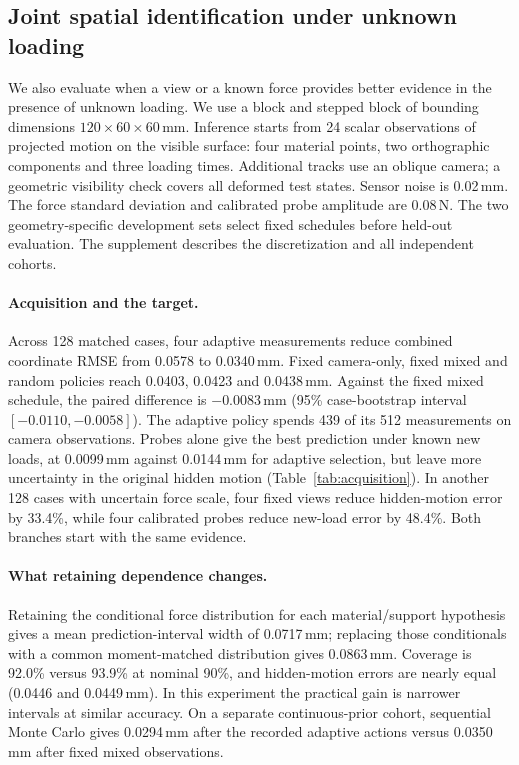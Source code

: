 \documentclass[10pt,twocolumn,letterpaper]{article}
\begin{document}
\subsection{Joint spatial identification under unknown loading}
We also evaluate when a view or a known force provides better evidence in the presence of unknown loading. We use a block and stepped block of bounding dimensions $120\times60\times60$\,mm. Inference starts from 24 scalar observations of projected motion on the visible surface: four material points, two orthographic components and three loading times. Additional tracks use an oblique camera; a geometric visibility check covers all deformed test states. Sensor noise is 0.02\,mm. The force standard deviation and calibrated probe amplitude are 0.08\,N. The two geometry-specific development sets select fixed schedules before held-out evaluation. The supplement describes the discretization and all independent cohorts.

\begin{table}[t]
\centering\small
\caption{\textbf{Prediction after four scalar observations.}
Means over 128 matched cases. Hidden and new-load errors are coordinate RMSE in mm. Material error is relative; force error is in newtons. Fixed denotes the development-selected mixed schedule.}
\label{tab:acquisition}

\end{table}

\paragraph{Acquisition and the target.}
Across 128 matched cases, four adaptive measurements reduce combined coordinate RMSE from 0.0578 to 0.0340\,mm. Fixed camera-only, fixed mixed and random policies reach 0.0403, 0.0423 and 0.0438\,mm. Against the fixed mixed schedule, the paired difference is $-0.0083$\,mm (95\% case-bootstrap interval $[-0.0110,-0.0058]$). The adaptive policy spends 439 of its 512 measurements on camera observations. Probes alone give the best prediction under known new loads, at 0.0099\,mm against 0.0144\,mm for adaptive selection, but leave more uncertainty in the original hidden motion (Table~\ref{tab:acquisition}). In another 128 cases with uncertain force scale, four fixed views reduce hidden-motion error by 33.4\%, while four calibrated probes reduce new-load error by 48.4\%. Both branches start with the same evidence.

\paragraph{What retaining dependence changes.}
Retaining the conditional force distribution for each material/support hypothesis gives a mean prediction-interval width of 0.0717\,mm; replacing those conditionals with a common moment-matched distribution gives 0.0863\,mm. Coverage is 92.0\% versus 93.9\% at nominal 90\%, and hidden-motion errors are nearly equal (0.0446 and 0.0449\,mm). In this experiment the practical gain is narrower intervals at similar accuracy. On a separate continuous-prior cohort, sequential Monte Carlo gives 0.0294\,mm after the recorded adaptive actions versus 0.0350\,mm after fixed mixed observations.
\end{document}
